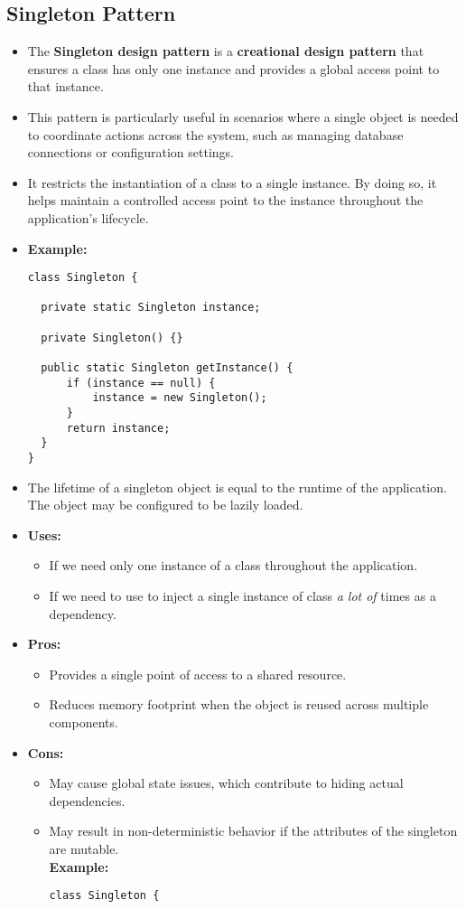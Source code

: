 \documentclass[12pt]{article}
\begin{document}
\subsection{Singleton Pattern}
\begin{itemize}
    \item The \textbf{Singleton design pattern} is a \textbf{creational design pattern} that ensures a class has only one instance and provides a global access point to that instance.
    \item This pattern is particularly useful in scenarios where a single object is needed to coordinate actions across the system, such as managing database connections or configuration settings.
    \item It restricts the instantiation of a class to a single instance. By doing so, it helps maintain a controlled access point to the instance throughout the application's lifecycle.
    \item \textbf{Example:}
          \begin{lstlisting}
class Singleton {

  private static Singleton instance;

  private Singleton() {}

  public static Singleton getInstance() {
      if (instance == null) {
          instance = new Singleton();
      }
      return instance;
  }
}
          \end{lstlisting}
    \item The lifetime of a singleton object is equal to the runtime of the application. The object may be configured to be lazily loaded.
    \item \textbf{Uses:}
    \begin{itemize}
      \item If we need only one instance of a class throughout the application.
      \item If we need to use to inject a single instance of class \textit{a lot of} times as a dependency.
    \end{itemize}
    \item \textbf{Pros:}
          \begin{itemize}
              \item Provides a single point of access to a shared resource.
              \item Reduces memory footprint when the object is reused across multiple components.
          \end{itemize}
    \item \textbf{Cons:}
          \begin{itemize}
              \item May cause global state issues, which contribute to hiding actual dependencies.
              \item May result in non-deterministic behavior if the attributes of the singleton are mutable. \\
                    \textbf{Example:}
                    \begin{lstlisting}
class Singleton {


\end{lstlisting}
\end{itemize}
\end{itemize}
\end{document}
